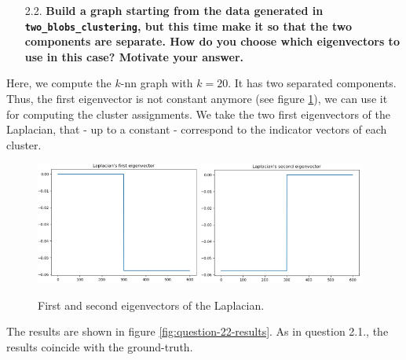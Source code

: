 \documentclass[a4paper, 11pt]{article}
\begin{document}
    \pagebreak
    
\begin{itemize}
    \item[2.2.] \textbf{Build a graph starting from the data generated in \texttt{two\_blobs\_clustering}, but this time make it so that the two components are separate. How do you choose which eigenvectors to use in this case? Motivate your answer.}
\end{itemize}

    Here, we compute the $k$-nn graph with $k = 20$. It has two separated components. Thus, the first eigenvector is not constant anymore (see figure \ref{fig:two-blobs-22-eigenvectors}), we can use it for computing the cluster assignments. We take the two first eigenvectors of the Laplacian, that - up to a constant - correspond to the indicator vectors of each cluster.
    
    \begin{figure}[!ht]
        \centering
        \includegraphics[width=0.48\textwidth]{images/two_blobs_22_first_eigenvector.jpg}
        \hfill
        \includegraphics[width=0.48\textwidth]{images/two_blobs_22_second_eigenvector.jpg}
        \caption{First and second eigenvectors of the Laplacian.}
        \label{fig:two-blobs-22-eigenvectors}
    \end{figure}

    The results are shown in figure \ref{fig:question-22-results}. As in question 2.1., the results coincide with the ground-truth.
    
\end{document}
